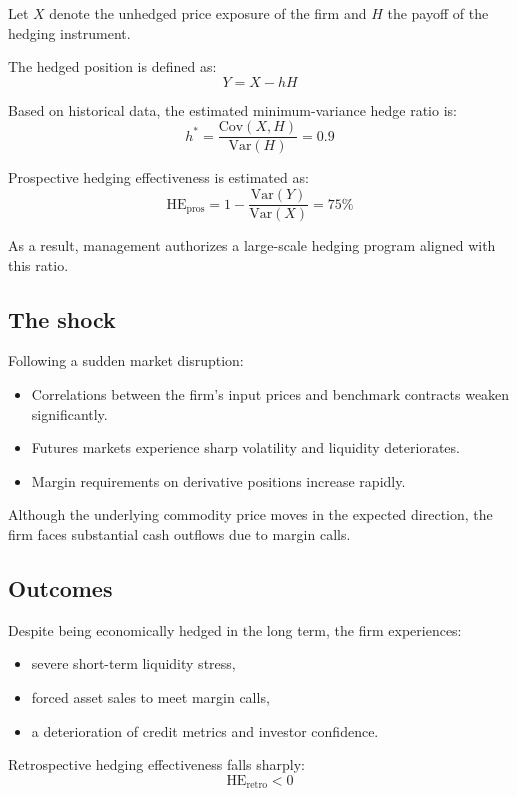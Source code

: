 \documentclass[11pt]{article}
\begin{document}
Let $X$ denote the unhedged price exposure of the firm and $H$ the payoff of
the hedging instrument.

The hedged position is defined as:
\[
Y = X - hH
\]

Based on historical data, the estimated minimum-variance hedge ratio is:
\[
h^* = \frac{\mathrm{Cov}(X,H)}{\mathrm{Var}(H)} = 0.9
\]

Prospective hedging effectiveness is estimated as:
\[
\text{HE}_{\text{pros}} = 1 - \frac{\mathrm{Var}(Y)}{\mathrm{Var}(X)} = 75\%
\]

As a result, management authorizes a large-scale hedging program aligned with
this ratio.

\subsection*{The shock}

Following a sudden market disruption:
\begin{itemize}
  \item[$\bullet$] Correlations between the firm’s input prices and benchmark
  contracts weaken significantly.
  \item[$\bullet$] Futures markets experience sharp volatility and liquidity
  deteriorates.
  \item[$\bullet$] Margin requirements on derivative positions increase rapidly.
\end{itemize}

Although the underlying commodity price moves in the expected direction,
the firm faces substantial cash outflows due to margin calls.

\subsection*{Outcomes}

Despite being economically hedged in the long term, the firm experiences:
\begin{itemize}
  \item[$\bullet$] severe short-term liquidity stress,
  \item[$\bullet$] forced asset sales to meet margin calls,
  \item[$\bullet$] a deterioration of credit metrics and investor confidence.
\end{itemize}

Retrospective hedging effectiveness falls sharply:
\[
\text{HE}_{\text{retro}} < 0
\]
\end{document}

